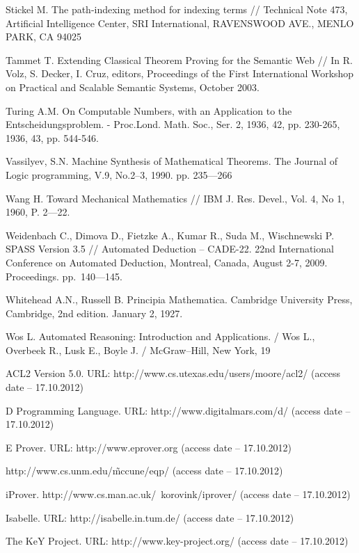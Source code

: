 \begin{thebibliography}{99}
 Stickel M. The path-indexing method for indexing terms // Technical Note 473, Artificial Intelligence Center, SRI International, RAVENSWOOD AVE., MENLO PARK, CA 94025

 Tammet T. Extending Classical Theorem Proving for the Semantic Web // In R. Volz, S. Decker, I. Cruz, editors, Proceedings of the First International Workshop on Practical and Scalable Semantic Systems, October 2003.

 Turing A.M. On Computable Numbers, with an Application to the Entscheidungsproblem. - Proc.Lond. Math. Soc., Ser. 2, 1936, 42, pp. 230-265, 1936, 43, pp. 544-546.

 Vassilyev, S.N. Machine Synthesis of Mathematical Theorems. The Journal of Logic programming, V.9, No.2--3, 1990. pp. 235---266

 Wang H. Toward Mechanical Mathematics // IBM J. Res. Devel., Vol. 4, No 1, 1960, P. 2---22.

 Weidenbach C., Dimova D., Fietzke A., Kumar R., Suda M., Wischnewski P. SPASS Version 3.5 // Automated Deduction – CADE-22. 22nd International Conference on Automated Deduction, Montreal, Canada, August 2-7, 2009. Proceedings. pp.~140---145.

 Whitehead A.N., Russell B. Principia Mathematica. Cambridge University Press, Cambridge, 2nd edition. January 2, 1927.

 Wos L. Automated Reasoning: Introduction and Applications. / Wos L., Overbeek R., Lusk E.,  Boyle J. / McGraw--Hill,  New York, 19


 ACL2 Version 5.0. URL: http://www.cs.utexas.edu/users/moore/acl2/ (access date -- 17.10.2012)

 D Programming Language. URL: http://www.digitalmars.com/d/ (access date -- 17.10.2012)

 E Prover. URL: http://www.eprover.org (access date -- 17.10.2012)

 http://www.cs.unm.edu/\~mccune/eqp/ (access date -- 17.10.2012)

 iProver. http://www.cs.man.ac.uk/~korovink/iprover/ (access date -- 17.10.2012)

 Isabelle. URL: http://isabelle.in.tum.de/ (access date -- 17.10.2012)

 The KeY Project. URL: http://www.key-project.org/ (access date -- 17.10.2012)


\end{thebibliography}
